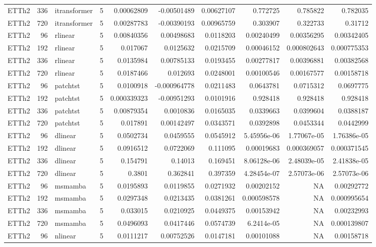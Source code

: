 \begin{longtable}{lrllrrrrrr}
ETTh2 & 336 & itransformer & 5 & 0.00062809 & -0.00501489 & 0.00627107 & 0.772725 & 0.785822 & 0.782035 \\
ETTh2 & 720 & itransformer & 5 & 0.00287783 & -0.00390193 & 0.00965759 & 0.303907 & 0.322733 & 0.31712 \\
ETTh2 & 96 & rlinear & 5 & 0.00840356 & 0.00498683 & 0.0118203 & 0.00240499 & 0.00356295 & 0.00342405 \\
ETTh2 & 192 & rlinear & 5 & 0.017067 & 0.0125632 & 0.0215709 & 0.00046152 & 0.000802643 & 0.000775353 \\
ETTh2 & 336 & rlinear & 5 & 0.0135984 & 0.00785133 & 0.0193455 & 0.00277817 & 0.00396881 & 0.00382568 \\
ETTh2 & 720 & rlinear & 5 & 0.0187466 & 0.012693 & 0.0248001 & 0.00100546 & 0.00167577 & 0.00158718 \\
ETTh2 & 96 & patchtst & 5 & 0.0100918 & -0.000964778 & 0.0211483 & 0.0643781 & 0.0715312 & 0.0697775 \\
ETTh2 & 192 & patchtst & 5 & 0.000339323 & -0.00951293 & 0.0101916 & 0.928418 & 0.928418 & 0.928418 \\
ETTh2 & 336 & patchtst & 5 & 0.00879354 & 0.0010836 & 0.0165035 & 0.0339663 & 0.0399604 & 0.0388187 \\
ETTh2 & 720 & patchtst & 5 & 0.017891 & 0.00142497 & 0.0343571 & 0.0392898 & 0.0453344 & 0.0442999 \\
ETTh2 & 96 & dlinear & 5 & 0.0502734 & 0.0459555 & 0.0545912 & 5.45956e-06 & 1.77067e-05 & 1.76386e-05 \\
ETTh2 & 192 & dlinear & 5 & 0.0916512 & 0.0722069 & 0.111095 & 0.00019683 & 0.000369057 & 0.000371545 \\
ETTh2 & 336 & dlinear & 5 & 0.154791 & 0.14013 & 0.169451 & 8.06128e-06 & 2.48039e-05 & 2.41838e-05 \\
ETTh2 & 720 & dlinear & 5 & 0.3801 & 0.362841 & 0.397359 & 4.28454e-07 & 2.57073e-06 & 2.57073e-06 \\
ETTh2 & 96 & msmamba & 5 & 0.0195893 & 0.0119855 & 0.0271932 & 0.00202152 & NA & 0.00292772 \\
ETTh2 & 192 & msmamba & 5 & 0.0297348 & 0.0213435 & 0.0381261 & 0.000598578 & NA & 0.000995654 \\
ETTh2 & 336 & msmamba & 5 & 0.033015 & 0.0210925 & 0.0449375 & 0.00153942 & NA & 0.00232993 \\
ETTh2 & 720 & msmamba & 5 & 0.0496093 & 0.0417446 & 0.0574739 & 6.2414e-05 & NA & 0.000139807 \\
ETTh2 & 96 & nlinear & 5 & 0.0111217 & 0.00752526 & 0.0147181 & 0.00101088 & NA & 0.00158718 \\

\end{longtable}
